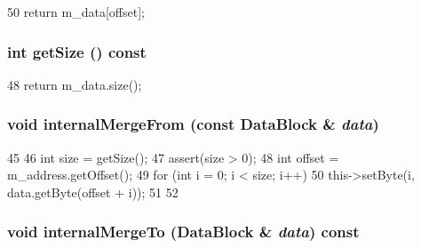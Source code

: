 \begin{DoxyCode}
50 { return m_data[offset]; }
\end{DoxyCode}
\hypertarget{classSubBlock_a4f8dbb76319fe40792867d6ca51ef447}{
\subsubsection[{getSize}]{\setlength{\rightskip}{0pt plus 5cm}int getSize () const}}
\label{classSubBlock_a4f8dbb76319fe40792867d6ca51ef447}



\begin{DoxyCode}
48 { return m_data.size(); }
\end{DoxyCode}
\hypertarget{classSubBlock_a981c16d3eee49c8ea8ef91c0ea405558}{
\subsubsection[{internalMergeFrom}]{\setlength{\rightskip}{0pt plus 5cm}void internalMergeFrom (const {\bf DataBlock} \& {\em data})}}
\label{classSubBlock_a981c16d3eee49c8ea8ef91c0ea405558}



\begin{DoxyCode}
45 {
46     int size = getSize();
47     assert(size > 0);
48     int offset = m_address.getOffset();
49     for (int i = 0; i < size; i++) {
50         this->setByte(i, data.getByte(offset + i));
51     }
52 }
\end{DoxyCode}
\hypertarget{classSubBlock_a1bb051cbcd8313199cf9cc0b9a2bd3d9}{
\subsubsection[{internalMergeTo}]{\setlength{\rightskip}{0pt plus 5cm}void internalMergeTo ({\bf DataBlock} \& {\em data}) const}}
\label{classSubBlock_a1bb051cbcd8313199cf9cc0b9a2bd3d9}



